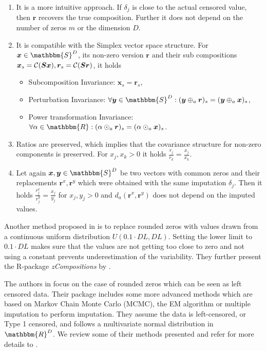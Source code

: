 \begin{enumerate}
	\item It is a more intuitive approach. If $\delta_j$ is close to the actual censored value, then $\bm{r}$ recovers the true composition. Further it does not depend on the number of zeros $m$ or the dimension $D$. 
	\item It is compatible with the Simplex vector space structure. For $\bm{x} \in \mathbbm{S}^D$, its non-zero version $\bm{r}$ and their sub compositions $\bm{x}_s = \mathcal{C}(\bm{Sx}),\bm{r}_s = \mathcal{C}(\bm{Sr})$, it holds 
	\begin{itemize}
		\item Subcomposition Invariance: $\bm{x}_s = \bm{r}_s$,
		\item Perturbation Invariance: $\forall \bm{y} \in \mathbbm{S}^D: (\bm{y} \oplus_a \bm{r})_s = (\bm{y} \oplus_a \bm{x})_s$,
		\item Power transformation Invariance: $\forall \alpha \in \mathbbm{R}: (\alpha \odot_a \bm{r})_s = (\alpha \odot_a \bm{x})_s$. 
	\end{itemize}
	\item Ratios are preserved, which implies that the covariance structure for non-zero components is preserved. For  $x_j,x_k >0$ it holds $\frac{r_j}{r_k} = \frac{x_j}{x_k}$. 
	\item Let again $\bm{x},\bm{y} \in \mathbbm{S}^D$ be two vectors with common zeros and their replacements $\bm{r}^x,\bm{r}^y$ which were obtained with the same imputation $\delta_j$. Then it holds $\frac{r^x_j}{r^y_j}=\frac{x_j}{y_j}$ for $x_j,y_j>0$ and $d_a(\bm{r}^x,\bm{r}^y)$ does not depend on the imputed values.
\end{enumerate}

Another method proposed in \textcite{Lubbe:2021} is to replace rounded zeros with values drawn from a continuous uniform distribution $U(0.1\cdot DL,DL)$. Setting the lower limit to $0.1\cdot DL$ makes sure that the values are not getting too close to zero and not using a constant prevents underestimation of the variability. They further present the R-package \textit{zCompositions} by \textcite{Palarea-Albaladejo:2015}. 

The authors in \textcite{Palarea-Albaladejo:2015} focus on the case of rounded zeros which can be seen as left censored data. Their package includes some more advanced methods which are based on Markov Chain Monte Carlo (MCMC), the EM algorithm or multiple imputation to perform imputation. They assume the data is left-censored, or Type 1 censored, and follows a multivariate normal distribution in $\mathbbm{R}^D$. We review some of their methods presented and refer for more details to \textcite{Palarea-Albaladejo:2015}.

